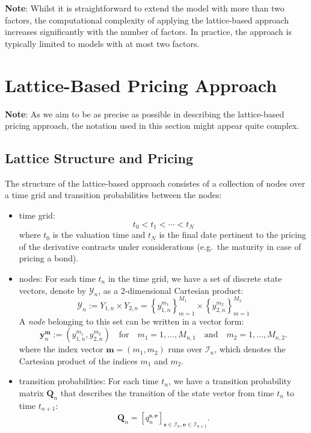 \documentclass{texyise}
\newcommand{\indexset}{\mathcal{I}}
\begin{document}
\textbf{Note}: Whilst it is straightforward to extend the model with more than two factors, the computational complexity of applying the lattice-based approach increases significantly with the number of factors. In practice, the approach is typically limited to models with at most two factors.

\section{Lattice-Based Pricing Approach}
\label{S:lattice-based-pricing}

\textbf{Note}: As we aim to be as precise as possible in describing the lattice-based pricing approach, the notation used in this section might appear quite complex. 


\subsection{Lattice Structure and Pricing}
\label{S:lattice-structure}

The structure of the lattice-based approach consistes of a collection of nodes over a time grid and transition probabilities between the nodes:
\begin{itemize}
    \item time grid:
    \begin{equation}
        t_0 < t_1 < \cdots < t_N \label{E:time-grid}
    \end{equation}
    where $t_0$ is the valuation time and $t_N$ is the final date pertinent to the pricing of the derivative contracts under considerations (e.g.\ the maturity in case of pricing a bond). 
    \item nodes: For each time $t_n$ in the time grid, we have a set of discrete state vectors, denote by $\mathcal{Y}_n$, as a 2-dimensional Cartesian product:
    \begin{equation}
        \mathcal{Y}_n := Y_{1,n} \times Y_{2,n} = \left\{ y_{1,n}^{m_1} \right\}_{m=1}^{M_1} \times \left\{ y_{2,n}^{m_2} \right\}_{m=1}^{M_2}
        \label{E:node-set}
    \end{equation}
    A {\em node} belonging to this set can be written in a vector form:
    \begin{equation}
        \bm{y}_{n}^{\bm{m}} := (y_{1,n}^{m_1}, y_{2,n}^{m_2}) \quad\text{for}\quad m_1 = 1, \ldots, M_{n,1} \quad\text{and}\quad m_2 = 1, \ldots, M_{n,2}.
    \end{equation}
    where the index vector $\bm{m} = (m_1, m_2)$ runs over $\indexset_n$, which denotes the Cartesian product of the indices $m_1$ and $m_2$.

    \item transition probabilities: For each time $t_n$, we have a transition probability matrix $\bm{Q}_n$ that describes the transition of the state vector from time $t_n$ to time $t_{n+1}$:
    \begin{equation}
        \bm{Q}_n = \left[ q_{n}^{\bm{s},\bm{e}} \right]_{\bm{s} \in \indexset_n, \bm{e} \in \indexset_{n+1}}.
    \end{equation} 

\end{itemize}
\end{document}
